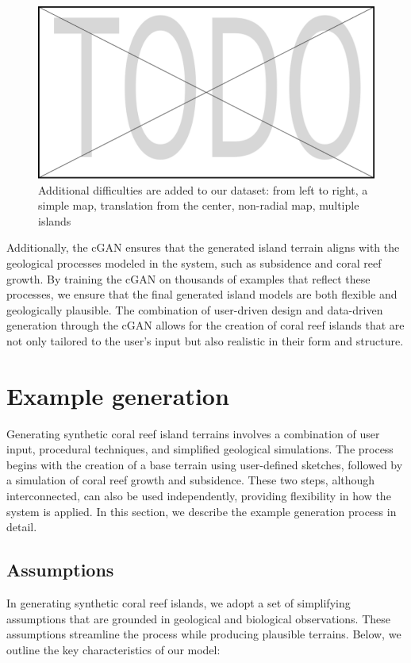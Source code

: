 \begin{figure}
    \includegraphics[width=0.9 \linewidth]{placeholder.pdf}
    \caption{Additional difficulties are added to our dataset: from left to right, a simple map, translation from the center, non-radial map, multiple islands}
    \label{fig:coral-island_difficulties-dataset}
\end{figure}

Additionally, the cGAN ensures that the generated island terrain aligns with the geological processes modeled in the system, such as subsidence and coral reef growth. By training the cGAN on thousands of examples that reflect these processes, we ensure that the final generated island models are both flexible and geologically plausible. The combination of user-driven design and data-driven generation through the cGAN allows for the creation of coral reef islands that are not only tailored to the user's input but also realistic in their form and structure.


\section{Example generation}
\label{sec:coral-island_example-generation}

Generating synthetic coral reef island terrains involves a combination of user input, procedural techniques, and simplified geological simulations. The process begins with the creation of a base terrain using user-defined sketches, followed by a simulation of coral reef growth and subsidence. These two steps, although interconnected, can also be used independently, providing flexibility in how the system is applied. In this section, we describe the example generation process in detail.


\subsection{Assumptions}
In generating synthetic coral reef islands, we adopt a set of simplifying assumptions that are grounded in geological and biological observations. These assumptions streamline the process while producing plausible terrains. Below, we outline the key characteristics of our model:

